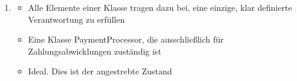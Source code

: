 \begin{infoBox}[title=Typen von Kohäsion (nach Qualität geordnet)]
\begin{enumerate}
\begin{itemize}
            \item {} Gut. Die Methoden teilen sich Daten und haben daher eine klare Verbindung
        \end{itemize}
        \item {}
        \begin{itemize}
            \item {} Alle Elemente einer Klasse tragen dazu bei, eine einzige, klar definierte Verantwortung zu erfüllen
            \item {} Eine Klasse PaymentProcessor, die ausschließlich für Zahlungsabwicklungen zuständig ist
            \item {} Ideal. Dies ist der angestrebte Zustand
        \end{itemize}
    \end{enumerate}
\end{infoBox}
